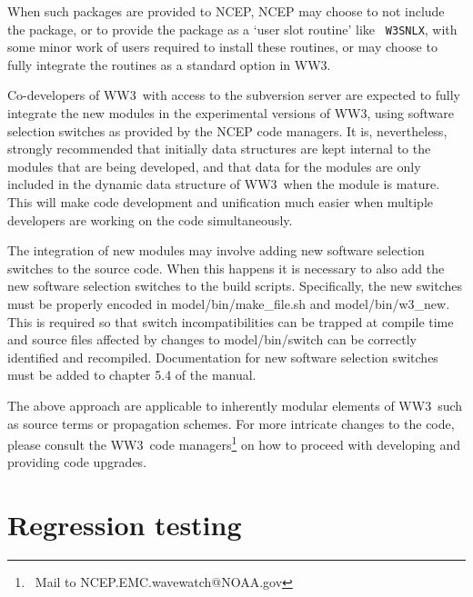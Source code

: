 \documentclass[12pt]{article}
\newcommand{\ws}{WW3}
\newcommand{\file}{\sf}
\newcommand{\code}{\tt}
\newcommand{\pb}{\strut \vfill \pagebreak}
\newcommand{\newsec}{\setcounter{equation}{0}
                      \setcounter{myfigno}{0}
                      \setcounter{mytabno}{0}}
\newcounter{myfigno}[section]
\newcounter{mytabno}[section]
\begin{document}
\noindent
When such packages are provided to NCEP, NCEP may choose to not include the
package, or to provide the package as a `user slot routine' like {\code
W3SNLX}, with some minor work of users required to install these routines, or
may choose to fully integrate the routines as a standard option in \ws.

\vspace{\baselineskip} \noindent Co-developers of \ws\ with access to the
subversion server are expected to fully integrate the new modules in the
experimental versions of \ws, using software selection switches as provided by
the NCEP code managers. It is, nevertheless, strongly recommended that
initially data structures are kept internal to the modules that are being
developed, and that data for the modules are only included in the dynamic data
structure of \ws\ when the module is mature. This will make code development
and unification much easier when multiple developers are working on the code
simultaneously.

\vspace{\baselineskip} \noindent The integration of new modules may involve
adding new software selection switches to the source code. When this happens it
is necessary to also add the new software selection switches to the build scripts.
Specifically, the new switches must be properly encoded in
{\file model/bin/make\_file.sh} and {\file model/bin/w3\_new}. This is required so
that switch incompatibilities can be trapped at compile time and source files
affected by changes to {\file model/bin/switch} can be correctly identified and
recompiled. Documentation for new software selection switches must be added to
chapter 5.4 of the manual.

\vspace{\baselineskip} \noindent The above approach are applicable to
inherently modular elements of \ws\ such as source terms or propagation
schemes. For more intricate changes to the code, please consult the \ws\ code
managers\footnote{~Mail to NCEP.EMC.wavewatch@NOAA.gov} on how to proceed with
developing and providing code upgrades.


\pb
\section{Regression testing} \label{sec:testing}
\newsec
\end{document}

